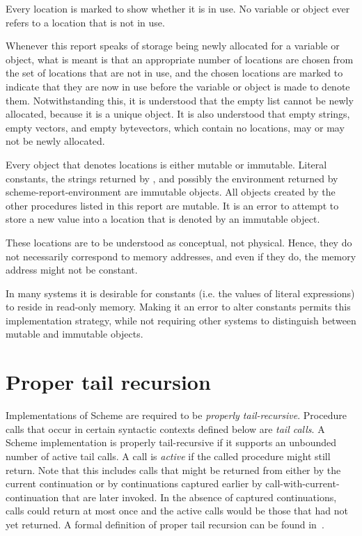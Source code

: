 Every location is marked to show whether it is in use.
No variable or object ever refers to a location that is not in use.

Whenever this report speaks of storage being newly allocated for a variable
or object, what is meant is that an appropriate number of locations are
chosen from the set of locations that are not in use, and the chosen
locations are marked to indicate that they are now in use before the variable
or object is made to denote them.
Notwithstanding this,
it is understood that the empty list cannot be newly allocated, because
it is a unique object.  It is also understood that empty strings, empty
vectors, and empty bytevectors, which contain no locations, may or may
not be newly allocated.

Every object that denotes locations is 
either mutable or
immutable.  Literal constants, the strings
returned by ,
and possibly the environment returned by {\cf scheme-report-environment}
are immutable objects.  All objects
created by the other procedures listed in this report are mutable.
It is an
error to attempt to store a new value into a location that is denoted by an
immutable object.


These locations are to be understood as conceptual, not physical.
Hence, they do not necessarily correspond to memory addresses,
and even if they do, the memory address might not be constant.

\begin{rationale}
In many systems it is desirable for constants (i.e. the values of
literal expressions) to reside in read-only memory.
Making it an error to alter constants permits this implementation strategy,
while not requiring other systems to distinguish between
mutable and immutable objects.
\end{rationale}

\section{Proper tail recursion}
\label{proper tail recursion}

Implementations of Scheme are required to be
{\em properly tail-recursive}.
Procedure calls that occur in certain syntactic
contexts defined below are {\em tail calls}.  A Scheme implementation is
properly tail-recursive if it supports an unbounded number of active
tail calls.  A call is {\em active} if the called procedure might still
return.  Note that this includes calls that might be returned from either
by the current continuation or by continuations captured earlier by
{\cf call-with-current-continuation} that are later invoked.
In the absence of captured continuations, calls could
return at most once and the active calls would be those that had not
yet returned.
A formal definition of proper tail recursion can be found
in~\cite{propertailrecursion}.

